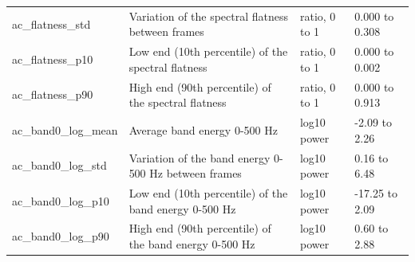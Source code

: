 \documentclass[11pt,a4paper]{article}
\begin{document}
\begin{center}
\begin{longtable}{>{\raggedright\arraybackslash}p{3.70cm}>{\raggedright\arraybackslash}p{6.65cm}>{\raggedright\arraybackslash}p{1.90cm}>{\raggedright\arraybackslash}p{2.56cm}}
\hspace{0pt}ac\_\allowbreak{}flatness\_\allowbreak{}std & \hspace{0pt}Variation of the spectral flatness between frames & \hspace{0pt}ratio, 0 to 1 & \hspace{0pt}0.000 to 0.308\\
\hspace{0pt}ac\_\allowbreak{}flatness\_\allowbreak{}p10 & \hspace{0pt}Low end (10th percentile) of the spectral flatness & \hspace{0pt}ratio, 0 to 1 & \hspace{0pt}0.000 to 0.002\\
\hspace{0pt}ac\_\allowbreak{}flatness\_\allowbreak{}p90 & \hspace{0pt}High end (90th percentile) of the spectral flatness & \hspace{0pt}ratio, 0 to 1 & \hspace{0pt}0.000 to 0.913\\
\hspace{0pt}ac\_\allowbreak{}band0\_\allowbreak{}log\_\allowbreak{}mean & \hspace{0pt}Average band energy 0-500 Hz & \hspace{0pt}log10 power & \hspace{0pt}-2.09 to 2.26\\
\hspace{0pt}ac\_\allowbreak{}band0\_\allowbreak{}log\_\allowbreak{}std & \hspace{0pt}Variation of the band energy 0-500 Hz between frames & \hspace{0pt}log10 power & \hspace{0pt}0.16 to 6.48\\
\hspace{0pt}ac\_\allowbreak{}band0\_\allowbreak{}log\_\allowbreak{}p10 & \hspace{0pt}Low end (10th percentile) of the band energy 0-500 Hz & \hspace{0pt}log10 power & \hspace{0pt}-17.25 to 2.09\\
\hspace{0pt}ac\_\allowbreak{}band0\_\allowbreak{}log\_\allowbreak{}p90 & \hspace{0pt}High end (90th percentile) of the band energy 0-500 Hz & \hspace{0pt}log10 power & \hspace{0pt}0.60 to 2.88\\

\end{longtable}
\end{center}
\end{document}
